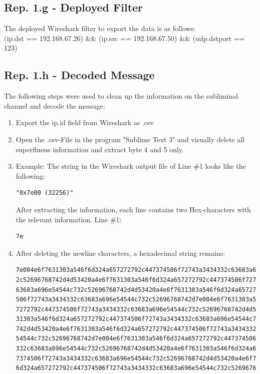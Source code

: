 \documentclass{article}
\begin{document}
\subsection*{Rep. 1.g - Deployed Filter}
The deployed Wireshark filter to export the data is as follows:\\
(ip.dst == 192.168.67.26) \&\& (ip.src == 192.168.67.50) \&\& (udp.dstport == 123)

\subsection*{Rep. 1.h - Decoded Message}
The following steps were used to clean up the information on the subliminal channel and decode the message:

\begin{enumerate}
\item Export the ip.id field from Wireshark as .csv
\item Open the .csv-File in the program "Sublime Text 3" and visually delete all superfluous information and extract byte 4 and 5 only.
\item Example: The string in the Wireshark output file of Line \#1 looks like the following:
\begin{verbatim}
"0x7e00 (32256)"
\end{verbatim}

After extracting the information, each line contains two Hex-characters with the relevant information. Line \#1:
\begin{verbatim}
7e
\end{verbatim}

\newpage

\item After deleting the newline characters, a hexadecimal string remains:

\begin{verbatim}
7e004e6f7631303a546f6d324a657272792c447374506f72743a3434332c63683a696e54544c73
2c52696768742d4d53420a4e6f7631303a546f6d324a657272792c447374506f72743a3434332c
63683a696e54544c732c52696768742d4d53420a4e6f7631303a546f6d324a657272792c447374
506f72743a3434332c63683a696e54544c732c52696768742d7e004e6f7631303a546f6d324a65
7272792c447374506f72743a3434332c63683a696e54544c732c52696768742d4d53420a4e6f76
31303a546f6d324a657272792c447374506f72743a3434332c63683a696e54544c732c52696768
742d4d53420a4e6f7631303a546f6d324a657272792c447374506f72743a3434332c63683a696e
54544c732c52696768742d7e004e6f7631303a546f6d324a657272792c447374506f72743a3434
332c63683a696e54544c732c52696768742d4d53420a4e6f7631303a546f6d324a657272792c44
7374506f72743a3434332c63683a696e54544c732c52696768742d4d53420a4e6f7631303a546f
6d324a657272792c447374506f72743a3434332c63683a696e54544c732c5269676874
\end{verbatim}


\end{enumerate}
\end{document}
